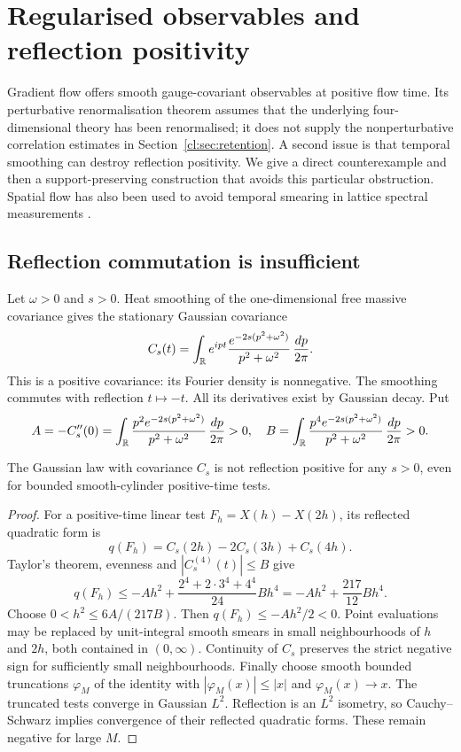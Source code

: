\section{Regularised observables and reflection positivity}\label{cl:app:flow}

Gradient flow offers smooth gauge-covariant observables at positive flow
time. Its perturbative renormalisation theorem \cite{LW11} assumes that
the underlying four-dimensional theory has been renormalised; it does
not supply the nonperturbative correlation estimates in
Section~\ref{cl:sec:retention}. A second issue is that temporal smoothing
can destroy reflection positivity. We give a direct counterexample and
then a support-preserving construction that avoids this particular
obstruction. Spatial flow has also been used to avoid temporal smearing
in lattice spectral measurements \cite{SS23}.

\subsection{Reflection commutation is insufficient}
Let $\omega>0$ and $s>0$. Heat smoothing of the one-dimensional free
massive covariance gives the stationary Gaussian covariance
\[
C_s(t)=\int_{\mathbb{R}}e^{ipt}
       \frac{e^{-2s(p^2+\omega^2)}}{p^2+\omega^2}\,\frac{dp}{2\pi}.
\]
This is a positive covariance: its Fourier density is nonnegative.
The smoothing commutes with reflection $t\mapsto-t$.
All its derivatives exist by Gaussian decay. Put
\[
A=-C_s''(0)=\int_{\mathbb{R}}\frac{p^2e^{-2s(p^2+\omega^2)}}{p^2+\omega^2}
                  \,\frac{dp}{2\pi}>0,
\quad
B=\int_{\mathbb{R}}\frac{p^4e^{-2s(p^2+\omega^2)}}{p^2+\omega^2}
                  \,\frac{dp}{2\pi}>0.
\]
\begin{proposition}\label{cl:prop:flow-rp-fails}
The Gaussian law with covariance $C_s$ is not reflection positive for
any $s>0$, even for bounded smooth-cylinder positive-time tests.
\end{proposition}
\begin{proof}
For a positive-time linear test $F_h=X(h)-X(2h)$, its reflected
quadratic form is
\[
q(F_h)=C_s(2h)-2C_s(3h)+C_s(4h).
\]
Taylor's theorem, evenness and $|C_s^{(4)}(t)|\le B$ give
\[
q(F_h)\le-Ah^2+\frac{2^4+2\cdot3^4+4^4}{24}Bh^4
=-Ah^2+\frac{217}{12}Bh^4.
\]
Choose $0<h^2\le6A/(217B)$. Then $q(F_h)\le-Ah^2/2<0$.
Point evaluations may be replaced by unit-integral smooth smears in
small neighbourhoods of $h$ and $2h$, both contained in $(0,\infty)$.
Continuity of $C_s$ preserves the strict negative sign for sufficiently
small neighbourhoods. Finally choose smooth bounded truncations
$\varphi_M$ of the identity with $|\varphi_M(x)|\le|x|$ and
$\varphi_M(x)\to x$. The truncated tests converge in Gaussian $L^2$.
Reflection is an $L^2$ isometry, so Cauchy--Schwarz implies convergence
of their reflected quadratic forms. These remain negative for large $M$.
\end{proof}

